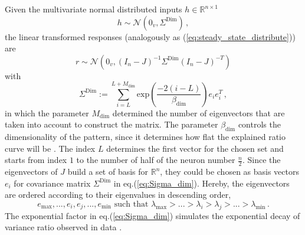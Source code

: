 \documentclass[11pt]{article}
\begin{document}
	Given the multivariate normal distributed inputs $h \in \mathbb{R}^{n \times 1}$
		\begin{equation} \label{eq:input_distribution_dimensionality}
			h \sim \mathcal{N}(0_v, \Sigma^{\text{Dim}}) \, ,
		\end{equation}
	the linear transformed responses (analogously as (\ref{eq:steady_state_distribute})) are
		\begin{equation} \label{eq:response_distribution_dimensionality}
			r \sim \mathcal{N}(0_v, (I_n - J)^{-1} \Sigma^{\text{Dim}} (I_n - J)^{-T})
		\end{equation}
	with 
		\begin{equation} \label{eq:Sigma_dim}
			\Sigma^{\text{Dim}} := \sum_{i=L}^{L+M_{\text{dim}}} \text{exp}\left(\frac{-2(i-L)}{\beta_{\text{dim}}}\right) e_i e_i^T \, , 
		\end{equation}
	in which the parameter $M_{\text{dim}}$ determined the number of eigenvectors that are taken into account to construct the matrix. The parameter $\beta_{\text{dim}}$ controls the dimensionality of the pattern, since it determines how flat the explained ratio curve will be \cite{tragenap2023nature}. 
	The index $L$ determines the first vector for the chosen set and starts from index $1$ to the number of half of the neuron number $\frac{n}{2}$. Since the eigenvectors of $J$ build a set of basis for $\mathbb{R}^n$, they could be chosen as basis vectors $e_i$ for covariance matrix $\Sigma^{\text{Dim}}$ in eq.(\ref{eq:Sigma_dim}). Hereby, the eigenvectors are ordered according to their eigenvalues in descending order, 
		\begin{equation} 
			e_{\text{max}}, ..., e_i, e_j, ..., e_{\text{min}} \, \, \text{such that} \, \, 	\lambda_{\text{max}} > ...> \lambda_i > \lambda_j > ... > \lambda_{\text{min}} \, .
		\end{equation}
	The exponential factor in eq.(\ref{eq:Sigma_dim}) simulates the exponential decay of variance ratio observed in data \cite{tragenap2023nature}. 
	
\end{document}

